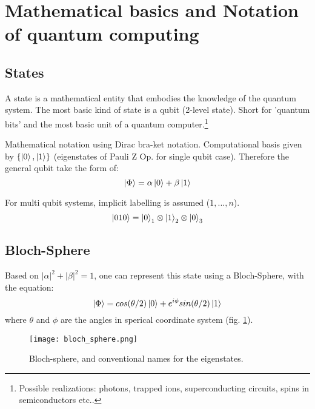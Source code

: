 \section{Mathematical basics and Notation of quantum computing}


\subsection{States}\label{sec:basic.math.states}
A state is a mathematical entity that embodies the knowledge of the quantum system.
The most basic kind of state is a qubit (2-level state).
Short for 'quantum bits' and the most basic unit of a quantum computer.\footnote{
    Possible realizations: photons, trapped ions, superconducting circuits, 
spins in semiconductors etc..}

Mathematical notation using Dirac bra-ket notation. 
Computational basis given by $\{\ket{0}, \ket{1}\}$ (eigenstates of Pauli Z Op. for single qubit case).
Therefore the general qubit take the form of:
\begin{equation*}
    \ket{\Phi} = \alpha \ket{0} + \beta \ket{1}
\end{equation*}


For multi qubit systems, implicit labelling is assumed ($1,...,n$).
\begin{equation*}
    \ket{010} = \ket{0}_1 \otimes \ket{1}_2 \otimes \ket{0}_3
\end{equation*}


\subsection{Bloch-Sphere}\label{sec:basic.math.bloch_sphere}
Based on $|\alpha|^2 + |\beta|^2=1$, one can represent this state using a Bloch-Sphere, with the equation:
\begin{equation*}
    \ket{\Phi} = cos(\theta /2) \ket{0} + e^{i\phi} sin(\theta/2) \ket{1}
\end{equation*}
where $\theta$ and $\phi$ are the angles in sperical coordinate system (fig. \ref{fig:bloch_sphere}). 

\begin{figure}[h]
    \begin{center}
        \texttt{[image: bloch\_sphere.png]}
    \end{center}
    \caption{Bloch-sphere, and conventional names for the eigenstates. }
    \label{fig:bloch_sphere}
\end{figure}

